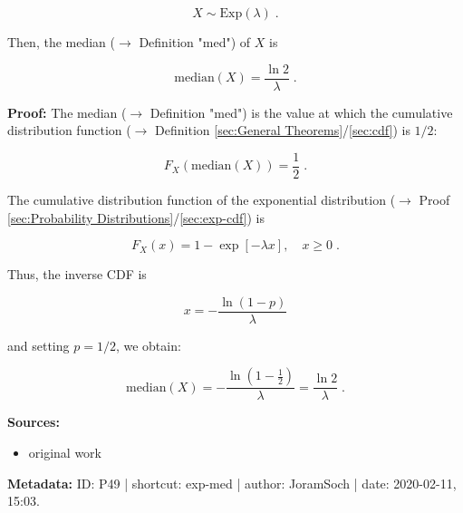 \documentclass[a4paper,12pt,twoside]{book}
\begin{document}
\begin{equation} \label{eq:exp-med-exp}
X \sim \mathrm{Exp}(\lambda) \; .
\end{equation}

Then, the median ($\rightarrow$ Definition "med") of $X$ is

\begin{equation} \label{eq:exp-med-exp-med}
\mathrm{median}(X) = \frac{\ln 2}{\lambda} \; .
\end{equation}


\vspace{1em}
\textbf{Proof:} The median ($\rightarrow$ Definition "med") is the value at which the cumulative distribution function ($\rightarrow$ Definition \ref{sec:General Theorems}/\ref{sec:cdf}) is $1/2$:

\begin{equation} \label{eq:exp-med-median}
F_X(\mathrm{median}(X)) = \frac{1}{2} \; .
\end{equation}

The cumulative distribution function of the exponential distribution ($\rightarrow$ Proof \ref{sec:Probability Distributions}/\ref{sec:exp-cdf}) is

\begin{equation} \label{eq:exp-med-exp-cdf}
F_X(x) = 1 - \exp[-\lambda x], \quad x \geq 0 \; .
\end{equation}

Thus, the inverse CDF is

\begin{equation} \label{eq:exp-med-exp-cdf-inv}
x = -\frac{\ln(1-p)}{\lambda}
\end{equation}

and setting $p = 1/2$, we obtain:

\begin{equation} \label{eq:exp-med-exp-med-qed}
\mathrm{median}(X) = -\frac{\ln(1-\frac{1}{2})}{\lambda} = \frac{\ln 2}{\lambda} \; .
\end{equation}


\vspace{1em}
\textbf{Sources:}
\begin{itemize}
\item original work\end{itemize}


\vspace{1em}
\textbf{Metadata:} ID: P49 | shortcut: exp-med | author: JoramSoch | date: 2020-02-11, 15:03.
\vspace{1em}
\end{document}
